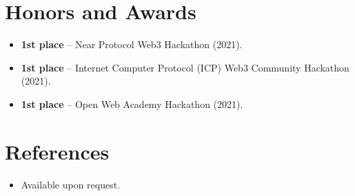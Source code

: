 \documentclass[11pt,a4paper,sans]{moderncv}
\begin{document}
\section{Honors and Awards}
\vspace{1pt}
\begin{itemize}
\item{\textbf{1st place} -- Near Protocol Web3 Hackathon (2021).}
\item{\textbf{1st place} -- Internet Computer Protocol (ICP) Web3 Community Hackathon (2021).}
\item{\textbf{1st place} -- Open Web Academy Hackathon (2021).}
\end{itemize}


\section{References}
\vspace{1pt}
\begin{itemize}
\item{Available upon request.}
\end{itemize}
\end{document}
